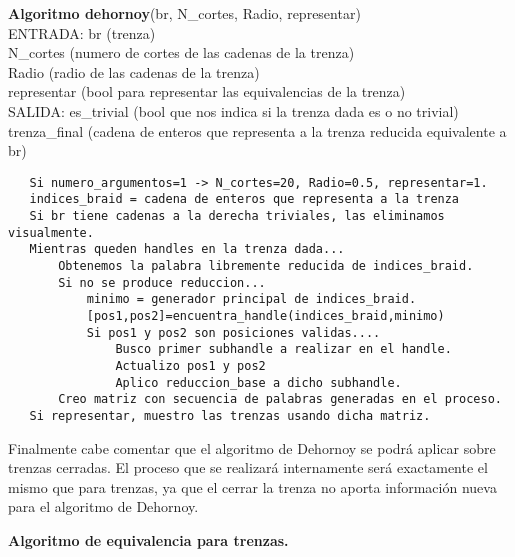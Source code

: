 \newpage
\begin{alg}
	\textbf{Algoritmo dehornoy}(br, N\_cortes, Radio, representar)\\
	ENTRADA: br (trenza)\\
	\hspace*{2.2cm} N\_cortes (numero de cortes de las cadenas de la trenza)\\
	\hspace*{2.2cm} Radio (radio de las cadenas de la trenza)\\
	\hspace*{2.2cm} representar (bool para representar las equivalencias de la trenza)\\
	SALIDA: \hspace{0.4cm} es\_trivial (bool que nos indica si la trenza dada es o no trivial) \\
	\hspace*{2.2cm} trenza\_final (cadena de enteros que representa a la trenza reducida equivalente a br)
	
\begin{lstlisting}
   Si numero_argumentos=1 -> N_cortes=20, Radio=0.5, representar=1.
   indices_braid = cadena de enteros que representa a la trenza
   Si br tiene cadenas a la derecha triviales, las eliminamos visualmente.
   Mientras queden handles en la trenza dada...
	   Obtenemos la palabra libremente reducida de indices_braid.
	   Si no se produce reduccion...
		   minimo = generador principal de indices_braid.
		   [pos1,pos2]=encuentra_handle(indices_braid,minimo)
		   Si pos1 y pos2 son posiciones validas....
			   Busco primer subhandle a realizar en el handle.
			   Actualizo pos1 y pos2
			   Aplico reduccion_base a dicho subhandle.
	   Creo matriz con secuencia de palabras generadas en el proceso.
   Si representar, muestro las trenzas usando dicha matriz.			   
\end{lstlisting}
\end{alg}

Finalmente cabe comentar que el algoritmo de Dehornoy se podrá aplicar sobre trenzas cerradas. El proceso que se realizará internamente será exactamente el mismo que para trenzas, ya que el cerrar la trenza no aporta información nueva para el algoritmo de Dehornoy. \\

\bigskip
\begin{center}
	\textbf{Algoritmo de equivalencia para trenzas.}
\end{center} 